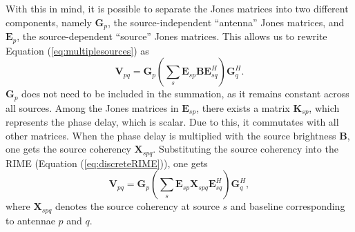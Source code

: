\documentclass{article}
\begin{document}
With this in mind, it is possible to separate the Jones matrices into two different components, namely $\mathbf{G}_p$, the source-independent ``antenna'' Jones matrices, and $\mathbf{E}_p$, the source-dependent ``source'' Jones matrices. This allows us to rewrite Equation (\ref{eq:multiplesources}) as
\begin{equation}
\label{eq:discreteRIME}
\mathbf{V}_{pq} = \mathbf{G}_p (\sum_s \mathbf{E}_{sp} \mathbf{B} \mathbf{E}_{sq}^H)\mathbf{G}^H_{q} .
\end{equation}
$\mathbf{G}_p$ does not need to be included in the summation, as it remains constant across all sources. Among the Jones matrices in $\mathbf{E}_{sp}$, there exists a matrix $\mathbf{K}_{sp}$, which represents the phase delay, which is scalar. Due to this, it commutates with all other matrices. When the phase delay is multiplied with the source brightness $\mathbf{B}$, one gets the source coherency $\mathbf{X}_{spq}$. Substituting the source coherency into the RIME (Equation (\ref{eq:discreteRIME})), one gets
\begin{equation}
\label{eq:sourcecoherency}
\mathbf{V}_{pq} = \mathbf{G}_p (\sum_s \mathbf{E}_{sp} \mathbf{X}_{spq} \mathbf{E}_{sq}^H)\mathbf{G}^H_{q} ,
\end{equation}
where $\mathbf{X}_{spq}$ denotes the source coherency at source $s$ and baseline corresponding to antennae $p$ and $q$.
\end{document}
